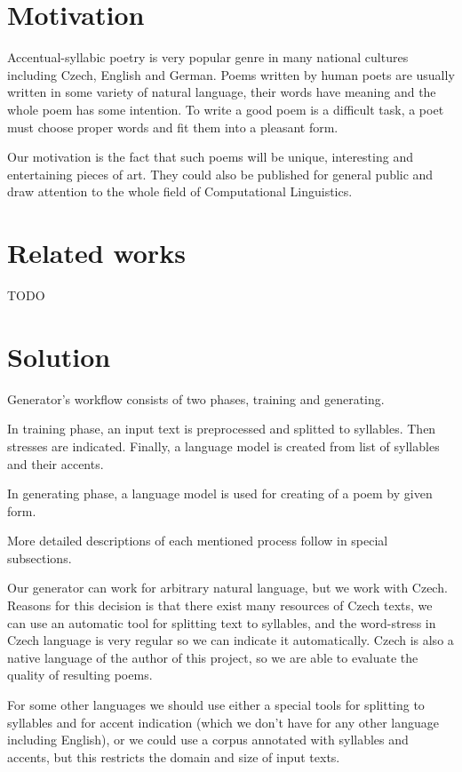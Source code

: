 \documentclass[a4]{article}
\begin{document}
\section{Motivation}

Accentual-syllabic poetry is very popular genre in many national cultures
including Czech, English and German. Poems written by human
poets are usually written in some variety of natural language, their words
have meaning and the whole poem has some intention.
To write a good poem is a difficult task, a poet must choose proper words
and fit them into a pleasant form. 

Our motivation is the fact that such poems will be unique, interesting and
entertaining pieces of art. They could also be published for
general public and draw attention to the whole field of Computational Linguistics.

\section{Related works}

TODO

\section{Solution}

Generator's workflow consists of two phases, training and generating. 

In
training phase, an input text is preprocessed and splitted to syllables.
Then stresses are indicated.  Finally, a language model is created from list
of syllables and their accents.

In generating phase, a language model is used for creating of a poem by given form.

More detailed descriptions of each mentioned process follow in special subsections.

Our generator can work for arbitrary natural language, but we work with
Czech. Reasons for this decision is that there exist many
resources of Czech texts, we can use an automatic tool for splitting text to syllables,
and the word-stress in Czech language is very regular so we can indicate
it automatically. Czech is also a native language of the author of this
project, so we are able to evaluate the quality of resulting poems. 

For some other languages we should use either a special tools for splitting
to syllables and for accent indication (which we don't have for any other
language including English),
or we could use a corpus annotated with syllables and accents, but this
restricts the domain and size of input texts.
\end{document}
